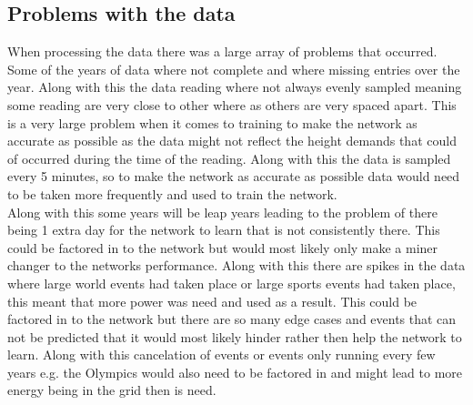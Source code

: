 \documentclass{IEEEtran}[11pt]
\begin{document}
\subsection{Problems with the data}
\begin{flushleft}
  When processing the data there was a large array of problems that occurred. Some of the years of data where not
  complete and where missing entries over the year. Along with this the data reading where not always evenly sampled
  meaning some reading are very close to other where as others are very spaced apart. This is a very large problem when
  it comes to training to make the network as accurate as possible as the data might not reflect the height demands that
  could of occurred during the time of the reading. Along with this the data is sampled every 5 minutes, so to make the
  network as accurate as possible data would need to be taken more frequently and used to train the network.
  \\
  \vspace{1.5mm}
  Along with this some years will be leap years leading to the problem of there being 1 extra day for the network to
  learn that is not consistently there. This could be factored in to the network but would most likely only make a miner
  changer to the networks performance. Along with this there are spikes in the data where large world events had taken
  place or large sports events had taken place, this meant that more power was need and used as a result.
  This could be factored in to the network but there are so many edge cases and events that can not be predicted that
  it would most likely hinder rather then help the network to learn. Along with this cancelation of events or events only
  running every few years e.g. the Olympics would also need to be factored in and might lead to more energy being in the
  grid then is need.


\end{flushleft}
\end{document}
